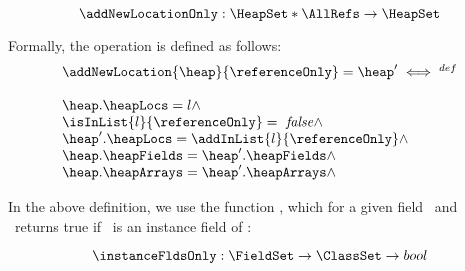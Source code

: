  $$ \addNewLocationOnly : \HeapSet *  \AllRefs   \rightarrow \HeapSet $$

 Formally, the operation is defined as follows: 
 $$ \begin{array}{l}
           \addNewLocation{\heap}{\referenceOnly} = \heap' \iff^{def} \\
	      \\
              \heap.\heapLocs = l \wedge \\
   	      \isInList{l}{\referenceOnly} = \mbox{ \rm \textit{false}} \wedge \\
	      \heap'.\heapLocs = \addInList{l}{\referenceOnly}  \wedge \\ 
	      \heap.\heapFields = \heap'.\heapFields \wedge \\
	      \heap.\heapArrays = \heap'.\heapArrays \wedge \\
    \end{array}$$ 

In the above definition, we use the function \instanceFldsOnly, which for a given field \fieldd \ and \clazz \ returns true if \fieldd \ is
an instance field of \clazz: 

$$
 \instanceFldsOnly : \FieldSet   \rightarrow \ClassSet \rightarrow bool 
$$

